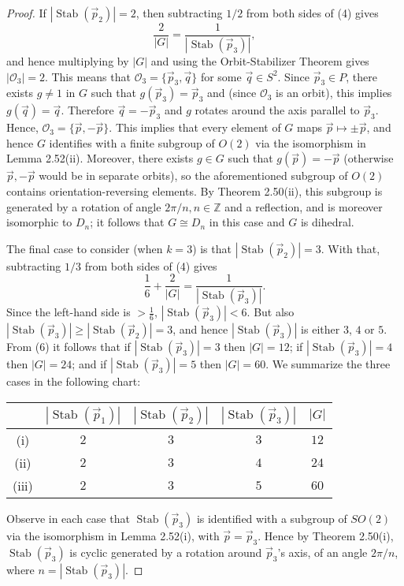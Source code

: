 \documentclass[leqno]{book}
\begin{document}
\begin{proof}
If $|\operatorname{Stab}(\vec p_2)|=2$, then subtracting $1/2$ from both sides of (4) gives
\begin{equation}\tag{5}
\frac 2{|G|}=\frac 1{|\operatorname{Stab}(\vec p_3)|},
\end{equation}
and hence multiplying by $|G|$ and using the Orbit-Stabilizer Theorem gives $|\mathcal O_3|=2$.  This means that $\mathcal O_3=\{\vec p_3,\vec q\}$ for some $\vec q\in S^2$.  Since $\vec p_3\in P$, there exists $g\ne 1$ in $G$ such that $g(\vec p_3)=\vec p_3$ and (since $\mathcal O_3$ is an orbit), this implies $g(\vec q)=\vec q$.  Therefore $\vec q=-\vec p_3$ and $g$ rotates around the axis parallel to $\vec p_3$.  Hence, $\mathcal O_3=\{\vec p,-\vec p\}$.  This implies that every element of $G$ maps $\vec p\mapsto\pm\vec p$, and hence $G$ identifies with a finite subgroup of $O(2)$ via the isomorphism in Lemma 2.52(ii).  Moreover, there exists $g\in G$ such that $g(\vec p)=-\vec p$ (otherwise $\vec p,-\vec p$ would be in separate orbits), so the aforementioned subgroup of $O(2)$ contains orientation-reversing elements.  By Theorem 2.50(ii), this subgroup is generated by a rotation of angle $2\pi/n,n\in\mathbb Z$ and a reflection, and is moreover isomorphic to $D_n$; it follows that $G\cong D_n$ in this case and $G$ is dihedral.

The final case to consider (when $k=3$) is that $|\operatorname{Stab}(\vec p_2)|=3$.  With that, subtracting $1/3$ from both sides of (4) gives
\begin{equation}\tag{6}
\frac 16+\frac 2{|G|}=\frac 1{|\operatorname{Stab}(\vec p_3)|}.
\end{equation}
Since the left-hand side is $>\frac 16$, $|\operatorname{Stab}(\vec p_3)|<6$.  But also $|\operatorname{Stab}(\vec p_3)|\geqslant|\operatorname{Stab}(\vec p_2)|=3$, and hence $|\operatorname{Stab}(\vec p_3)|$ is either $3$, $4$ or $5$.  From (6) it follows that if $|\operatorname{Stab}(\vec p_3)|=3$ then $|G|=12$; if $|\operatorname{Stab}(\vec p_3)|=4$ then $|G|=24$; and if $|\operatorname{Stab}(\vec p_3)|=5$ then $|G|=60$.  We summarize the three cases in the following chart:
\begin{center}
\begin{tabular}{cc|c|c||c}
& $|\operatorname{Stab}(\vec p_1)|$ & $|\operatorname{Stab}(\vec p_2)|$ & $|\operatorname{Stab}(\vec p_3)|$ & $|G|$ \\\hline
(i) & $2$ & $3$ & $3$ & $12$ \\
(ii) & $2$ & $3$ & $4$ & $24$ \\
(iii) & $2$ & $3$ & $5$ & $60$
\end{tabular}
\end{center}
Observe in each case that $\operatorname{Stab}(\vec p_3)$ is identified with a subgroup of $SO(2)$ via the isomorphism in Lemma 2.52(i), with $\vec p=\vec p_3$.  Hence by Theorem 2.50(i), $\operatorname{Stab}(\vec p_3)$ is cyclic generated by a rotation around $\vec p_3$'s axis, of an angle $2\pi/n$, where $n=|\operatorname{Stab}(\vec p_3)|$.


\end{proof}
\end{document}

